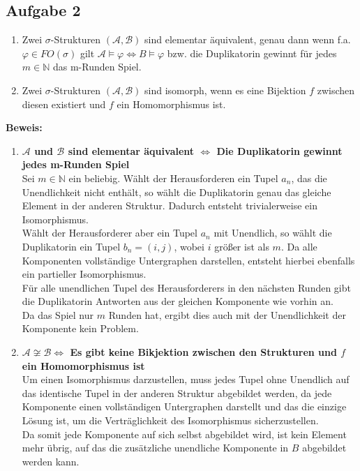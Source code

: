 \documentclass[a4paper,10pt]{article}
\newcommand{\N}{\mathbb{N}}
\begin{document}
\subsection*{Aufgabe 2}
\begin{enumerate}
	\item 	Zwei $\sigma$-Strukturen $(\mathcal{A},\mathcal{B})$ sind elementar äquivalent, genau dann wenn f.a. $\varphi \in FO(\sigma)$ gilt $\mathcal{A} \vDash \varphi \Leftrightarrow B \vDash \varphi$ bzw. die Duplikatorin gewinnt für jedes $m \in \N$ das m-Runden Spiel. 
	\item  	Zwei $\sigma$-Strukturen $(\mathcal{A},\mathcal{B})$ sind isomorph, wenn es eine Bijektion $f$ zwischen diesen existiert und $f$ ein Homomorphismus ist.
\end{enumerate}
\textbf{Beweis:}
\begin{enumerate}
	\item \textbf{$\mathcal{A}$ und $\mathcal{B}$ sind elementar äquivalent $\Leftrightarrow$ Die Duplikatorin gewinnt jedes m-Runden Spiel} \\
	Sei $m \in \N$ ein beliebig. Wählt der Herausforderen ein Tupel $a_n$, das die Unendlichkeit nicht enthält, so wählt die Duplikatorin genau das gleiche Element in der anderen Struktur. Dadurch entsteht trivialerweise ein Isomorphismus.\\
	Wählt der Herausforderer aber ein Tupel $a_n$ mit Unendlich, so wählt die Duplikatorin ein Tupel $b_n = (i,j)$, wobei $i$ größer ist als $m$. Da alle Komponenten vollständige Untergraphen darstellen, entsteht hierbei ebenfalls ein partieller Isomorphismus.\\
	Für alle unendlichen Tupel des Herausforderers in den nächsten Runden gibt die Duplikatorin Antworten aus der gleichen Komponente wie vorhin an.\\
	Da das Spiel nur $m$ Runden hat, ergibt dies auch mit der Unendlichkeit der Komponente kein Problem.
	\item \textbf{$\mathcal{A} \not \cong \mathcal{B} \Leftrightarrow$ Es gibt keine Bikjektion zwischen den Strukturen und $f$ ein Homomorphismus ist} \\
	Um einen Isomorphismus darzustellen, muss jedes Tupel ohne Unendlich auf das identische Tupel in der anderen Struktur abgebildet werden, da jede Komponente einen vollständigen Untergraphen darstellt und das die einzige Lösung ist, um die Verträglichkeit des Isomorphismus sicherzustellen. \\
	Da somit jede Komponente auf sich selbst abgebildet wird, ist kein Element mehr übrig, auf das die zusätzliche unendliche Komponente in $B$ abgebildet werden kann.
\end{enumerate}
\end{document}
